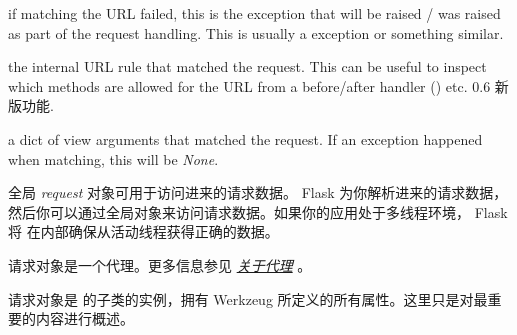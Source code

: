 \documentclass[a4paper,12pt]{sphinxmanual}
\begin{document}
\begin{fulllineitems}

\begin{fulllineitems}
\label{api:flask.Request.routing_exception}
if matching the URL failed, this is the exception that will be
raised / was raised as part of the request handling.  This is
usually a \href{http://werkzeug.pocoo.org/docs/exceptions/\#werkzeug.exceptions.NotFound}{} exception or
something similar.

\end{fulllineitems}


\begin{fulllineitems}
\label{api:flask.Request.url_rule}
the internal URL rule that matched the request.  This can be
useful to inspect which methods are allowed for the URL from
a before/after handler () etc.
0.6 新版功能.
\end{fulllineitems}


\begin{fulllineitems}
\label{api:flask.Request.view_args}
a dict of view arguments that matched the request.  If an exception
happened when matching, this will be \emph{None}.

\end{fulllineitems}


\end{fulllineitems}


\begin{fulllineitems}
\label{api:flask.request}
全局 \emph{request} 对象可用于访问进来的请求数据。 Flask 为你解析进来的请求数据，
然后你可以通过全局对象来访问请求数据。如果你的应用处于多线程环境， Flask 将
在内部确保从活动线程获得正确的数据。

请求对象是一个代理。更多信息参见 {\hyperref[reqcontext:notes-on-proxies]{\emph{关于代理}}} 。

请求对象是 \href{http://werkzeug.pocoo.org/docs/wrappers/\#werkzeug.wrappers.Request}{} 的子类的实例，拥有 Werkzeug
所定义的所有属性。这里只是对最重要的内容进行概述。

\end{fulllineitems}
\end{document}
